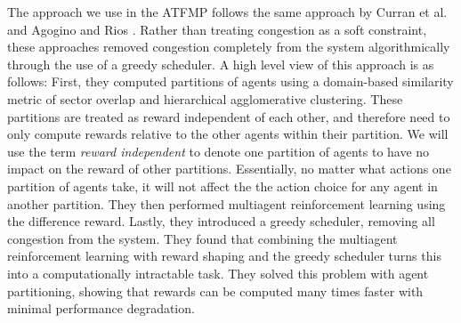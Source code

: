 \documentclass[letterpaper]{article}
\begin{document}

The approach we use in the ATFMP follows the same approach by Curran et al. \cite{Curran:2013:AHC:2484920.2485183} and Agogino and Rios \cite{Agogino:2009:EEM:1570256.1570258,Rios}. Rather than treating congestion as a soft constraint, these approaches removed congestion completely from the system algorithmically through the use of a greedy scheduler. A high level view of this approach is as follows: First, they computed partitions of agents using a domain-based similarity metric of sector overlap and hierarchical agglomerative clustering. These partitions are treated as reward independent of each other, and therefore need to only compute rewards relative to the other agents within their partition. We will use the term \textit{reward independent} to denote one partition of agents to have no impact on the reward of other partitions. Essentially, no matter what actions one partition of agents take, it will not affect the the action choice for any agent in another partition. They then performed multiagent reinforcement learning using the difference reward. Lastly, they introduced a greedy scheduler, removing all congestion from the system. They found that combining the multiagent reinforcement learning with reward shaping and the greedy scheduler turns this into a computationally intractable task. They solved this problem with agent partitioning, showing that rewards can be computed many times faster with minimal performance degradation.

\end{document}
